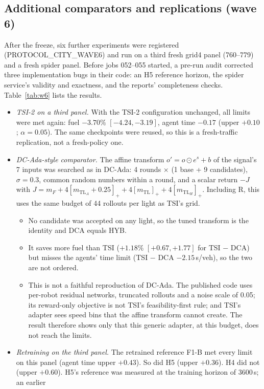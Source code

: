 \documentclass[11pt]{article}
\begin{document}
\subsection{Additional comparators and replications (wave 6)}\label{sec:w6}
After the freeze, six further experiments were registered (PROTOCOL\_CITY\_WAVE6) and run on a third fresh grid4 panel (760--779) and a
fresh spider panel. Before jobs 052--055 started, a pre-run audit corrected three implementation bugs in their code: an H5 reference
horizon, the spider service's validity and exactness, and the reports' completeness checks. Table~\ref{tab:w6} lists the results.
\begin{itemize}
\item \emph{TSI-2 on a third panel.} With the TSI-2 configuration unchanged, all limits were met again: fuel $-3.70\%$ $[-4.24,-3.19]$,
agent time $-0.17$ (upper $+0.10$; $\alpha=0.05$). The same checkpoints were reused, so this is a fresh-traffic replication, not a
fresh-policy one.
\item \emph{DC-Ada-style comparator.} The affine transform $o'=o\odot e^{s}+b$ of the signal's 7 inputs was searched as in DC-Ada:
4 rounds $\times$ (1 base + 9 candidates), $\sigma=0.3$, common random numbers within a round, and a scalar return
$-J$ with $J=m_F+4[m_{\mathrm{TL}_A}+0.25]_++4[m_{\mathrm{TL}}]_++4[m_{\mathrm{TL}_H}]_+$. Including R, this uses the same budget of 44
rollouts per light as TSI's grid.
\begin{itemize}\setlength\itemsep{0pt}
\item No candidate was accepted on any light, so the tuned transform is the identity and DCA equals HYB.
\item It saves more fuel than TSI ($+1.18\%$ $[+0.67,+1.77]$ for TSI $-$ DCA) but misses the agents' time limit (TSI $-$ DCA $-2.15$\,s/veh),
so the two are not ordered.
\item This is not a faithful reproduction of DC-Ada. The published code uses per-robot residual networks, truncated rollouts and a noise scale
of 0.05; its reward-only objective is not TSI's feasibility-first rule; and TSI's adapter sees speed bins that the affine transform cannot
create. The result therefore shows only that this generic adapter, at this budget, does not reach the limits.
\end{itemize}
\item \emph{Retraining on the third panel.} The retrained reference F1-B met every limit on this panel (agent time upper $+0.43$). So did
H5 (upper $+0.36$). H4 did not (upper $+0.60$). H5's reference was measured at the training horizon of 3600\,s; an earlier

\end{itemize}
\end{document}
